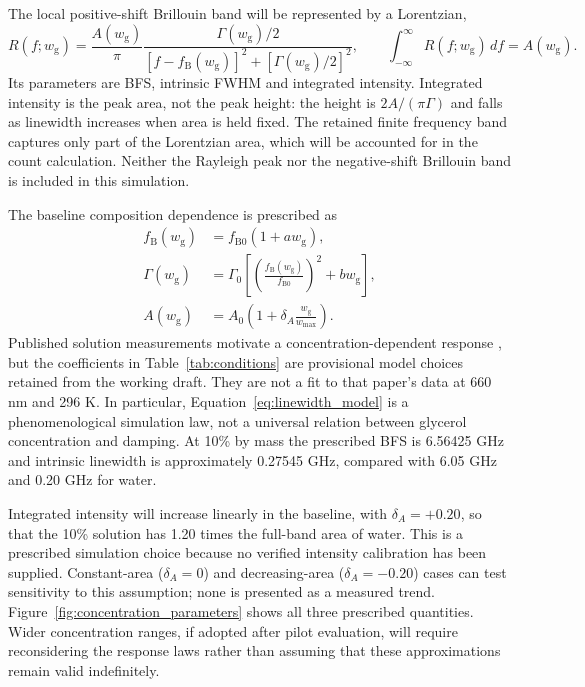 \documentclass[11pt]{article}
\newcommand{\wg}{w_{\mathrm g}}
\newcommand{\wmax}{w_{\max}}
\begin{document}
The local positive-shift Brillouin band will be represented by a Lorentzian,
\begin{equation}
 R(f;\wg)=\frac{A(\wg)}{\pi}
 \frac{\Gamma(\wg)/2}{[f-f_{\mathrm B}(\wg)]^2+[\Gamma(\wg)/2]^2},
 \qquad \int_{-\infty}^{\infty}R(f;\wg)\,df=A(\wg).
 \label{eq:component_spectrum}
\end{equation}
Its parameters are BFS, intrinsic FWHM and integrated intensity. Integrated intensity is the peak area, not the peak height: the height is $2A/(\pi\Gamma)$ and falls as linewidth increases when area is held fixed. The retained finite frequency band captures only part of the Lorentzian area, which will be accounted for in the count calculation. Neither the Rayleigh peak nor the negative-shift Brillouin band is included in this simulation.

The baseline composition dependence is prescribed as
\begin{align}
 f_{\mathrm B}(\wg)&=f_{\mathrm B0}(1+a\wg), \label{eq:bfs_model}\\
 \Gamma(\wg)&=\Gamma_0\left[\left(\frac{f_{\mathrm B}(\wg)}{f_{\mathrm B0}}\right)^2+b\wg\right], \label{eq:linewidth_model}\\
 A(\wg)&=A_0\left(1+\delta_A\frac{\wg}{\wmax}\right). \label{eq:intensity_model}
\end{align}
Published solution measurements motivate a concentration-dependent response \citep{adichtchev2019}, but the coefficients in Table~\ref{tab:conditions} are provisional model choices retained from the working draft. They are not a fit to that paper's data at 660 nm and 296 K. In particular, Equation~\ref{eq:linewidth_model} is a phenomenological simulation law, not a universal relation between glycerol concentration and damping. At 10\% by mass the prescribed BFS is 6.56425 GHz and intrinsic linewidth is approximately 0.27545 GHz, compared with 6.05 GHz and 0.20 GHz for water.

Integrated intensity will increase linearly in the baseline, with $\delta_A=+0.20$, so that the 10\% solution has 1.20 times the full-band area of water. This is a prescribed simulation choice because no verified intensity calibration has been supplied. Constant-area ($\delta_A=0$) and decreasing-area ($\delta_A=-0.20$) cases can test sensitivity to this assumption; none is presented as a measured trend. Figure~\ref{fig:concentration_parameters} shows all three prescribed quantities. Wider concentration ranges, if adopted after pilot evaluation, will require reconsidering the response laws rather than assuming that these approximations remain valid indefinitely.
\end{document}
